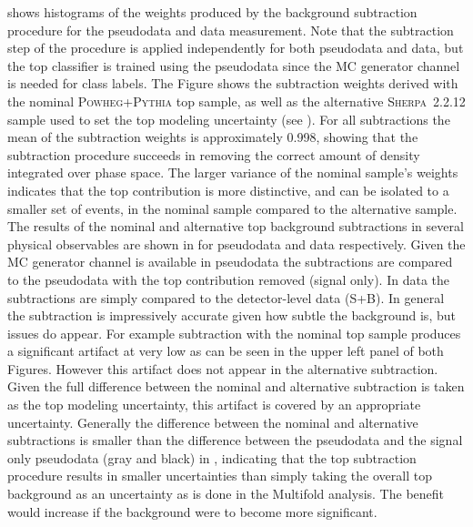  shows histograms of the weights produced by the background subtraction procedure for the pseudodata and data measurement.
Note that the subtraction step of the procedure is applied independently for both pseudodata and data, but the top classifier is trained using the pseudodata since the MC generator channel is needed for class labels.
The Figure shows the subtraction weights derived with the nominal \textsc{Powheg}+\textsc{Pythia} top sample, as well as the alternative \textsc{Sherpa}~2.2.12 sample used to set the top modeling uncertainty (see ).
For all subtractions the mean of the subtraction weights is approximately 0.998, showing that the subtraction procedure succeeds in removing the correct amount of density integrated over phase space.
The larger variance of the nominal sample's weights indicates that the top contribution is more distinctive, and can be isolated to a smaller set of events, in the nominal sample compared to the alternative sample.
The results of the nominal and alternative top background subtractions in several physical observables are shown in  for pseudodata and data respectively.
Given the MC generator channel is available in pseudodata the subtractions are compared to the pseudodata with the top contribution removed (signal only).
In data the subtractions are simply compared to the detector-level data (S+B).
In general the subtraction is impressively accurate given how subtle the background is, but issues do appear.
For example subtraction with the nominal top sample produces a significant artifact at very low \nch as can be seen in the upper left panel of both Figures.
However this artifact does not appear in the alternative subtraction.
Given the full difference between the nominal and alternative subtraction is taken as the top modeling uncertainty, this artifact is covered by an appropriate uncertainty.
Generally the difference between the nominal and alternative subtractions is smaller than the difference between the pseudodata and the signal only pseudodata (gray and black) in , indicating that the top subtraction procedure results in smaller uncertainties than simply taking the overall top background as an uncertainty as is done in the Multifold analysis.
The benefit would increase if the background were to become more significant.

